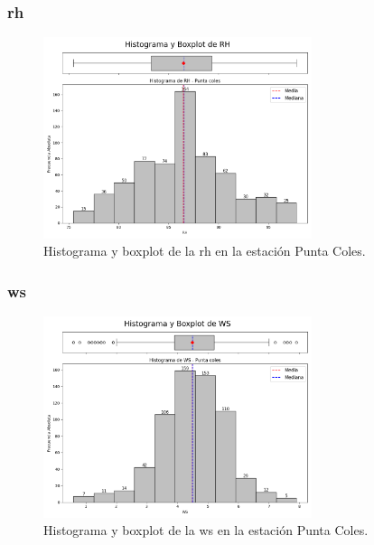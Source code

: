 \subsubsection*{\gls{rh} }
\begin{figure}[htbp]
\centering
\includegraphics[width=0.7\textwidth]{resultados/por_estacion_meteorologica/Punta_Coles/RH_histograma.png}
\caption{Histograma y boxplot de la \gls{rh}  en la estación Punta Coles.}
\label{fig:punta_coles_RH}
\end{figure}

\subsubsection*{\gls{ws} }
\begin{figure}[htbp]
\centering
\includegraphics[width=0.7\textwidth]{resultados/por_estacion_meteorologica/Punta_Coles/WS_histograma.png}
\caption{Histograma y boxplot de la \gls{ws}  en la estación Punta Coles.}
\label{fig:punta_coles_WS}
\end{figure}

